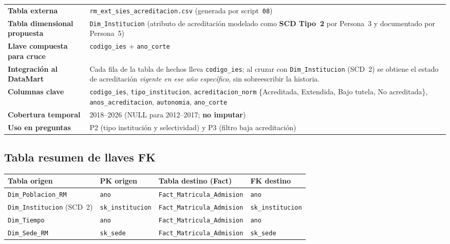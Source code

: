 \documentclass[11pt,a4paper]{article}
\begin{document}
\begin{center}
\small
\begin{tabularx}{\textwidth}{@{}>{\bfseries}p{3.8cm}Y@{}}
\toprule
Tabla externa & \texttt{rm\_ext\_sies\_acreditacion.csv}
  (generada por script~\texttt{08}) \\
Tabla dimensional propuesta &
  \texttt{Dim\_Institucion} (atributo de acreditación modelado como
  \textbf{SCD Tipo~2} por Persona~3 y documentado por Persona~5) \\
Llave compuesta para cruce &
  \texttt{codigo\_ies} + \texttt{ano\_corte} \\
Integración al DataMart &
  Cada fila de la tabla de hechos lleva \texttt{codigo\_ies}; al cruzar
  con \texttt{Dim\_Institucion} (SCD~2) se obtiene el estado de acreditación
  \emph{vigente en ese año específico}, sin sobreescribir la historia. \\
Columnas clave &
  \texttt{codigo\_ies}, \texttt{tipo\_institucion},
  \texttt{acreditacion\_norm} \{Acreditada, Extendida, Bajo tutela,
  No acreditada\},
  \texttt{anos\_acreditacion}, \texttt{autonomia}, \texttt{ano\_corte} \\
Cobertura temporal & 2018--2026 (NULL para 2012--2017; \textbf{no imputar}) \\
Uso en preguntas & P2 (tipo institución y selectividad) y P3 (filtro baja acreditación) \\
\bottomrule
\end{tabularx}
\end{center}

\subsection{Tabla resumen de llaves FK}

\begin{center}
\small
\begin{tabular}{@{}llll@{}}
\toprule
\textbf{Tabla origen} & \textbf{PK origen} & \textbf{Tabla destino (Fact)} & \textbf{FK destino} \\
\midrule
\texttt{Dim\_Poblacion\_RM} & \texttt{ano} &
  \texttt{Fact\_Matricula\_Admision} & \texttt{ano} \\
\texttt{Dim\_Institucion} (SCD~2) & \texttt{sk\_institucion} &
  \texttt{Fact\_Matricula\_Admision} & \texttt{sk\_institucion} \\
\texttt{Dim\_Tiempo} & \texttt{ano} &
  \texttt{Fact\_Matricula\_Admision} & \texttt{ano} \\
\texttt{Dim\_Sede\_RM} & \texttt{sk\_sede} &
  \texttt{Fact\_Matricula\_Admision} & \texttt{sk\_sede} \\
\bottomrule
\end{tabular}
\end{center}
\end{document}

